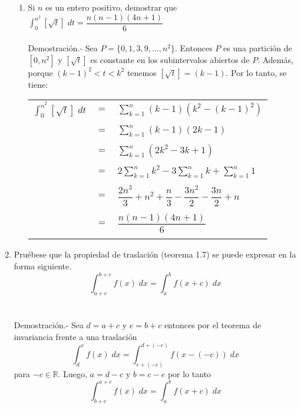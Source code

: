 \begin{enumerate}
\begin{enumerate}[\bfseries (a)]
		\item Si $n$ es un entero positivo, demostrar que $\displaystyle\int_{0}^{n^2} \left[ \sqrt{t}\right] \; dt = \dfrac{n(n-1)(4n+1)}{6}$\\\\
		    Demostración.-\; Sea $P=\lbrace 0,1,3,9,...,n^2\rbrace$. Entonces $P$ es una partición de $\left[0,n^2\right]$ y $\left[\sqrt{t}\right]$ es constante en los subintervalos abiertos de $P$. Además, porque $(k-1)^2 < t < k^2$ tenemos $\left[\sqrt{t}\right]=(k-1)$. Por lo tanto, se tiene:
		    \begin{center}
			\begin{tabular}{rcl}
			    $\displaystyle\int_{0}^{n^2} \left[\sqrt{t}\right]\; dt$&$=$&$\sum\limits_{k=1}^{n} (k-1)(k^2-(k-1)^2)$\\\\
			    &$=$&$\sum\limits_{k=1}^{n}(k-1)(2k-1)$\\\\
			    &$=$&$\sum\limits_{k=1}^{n} (2k^2 - 3k + 1)$\\\\
			    &$=$&$2\sum\limits_{k=1}^{n} k^2 - 3\sum\limits_{k=1}^{n} k + \sum\limits_{k=1}^{n} 1$\\\\
			    &$=$&$\dfrac{2n^3}{3} + n^2 + \dfrac{n}{3} - \dfrac{3n^2}{2} - \dfrac{3n}{2} + n$\\\\
			    &$=$&$\dfrac{n(n-1)(4n+1)}{6}$\\\\
			\end{tabular}
		    \end{center}
	\end{enumerate}

    \item Pruébese que la propiedad de traslación (teorema 1.7) se puede expresar en la forma siguiente. $$\displaystyle\int_{a+c}^{b+c}f(x) \; dx = \int_{a}^{b}f(x+c)\; dx$$\\\\
	Demostración.-\; Sea $d=a+c$ y $e=b+c$ entonces por el teorema de invariancia frente a una traslación $$\displaystyle\int_{d}^{e} f(x) \; dx = \int_{e+(-c)}^{d+(-c)} f(x-(-c)) \; dx$$ para $-c \in \mathbb{R}$. Luego, $a=d-c$ y $b=c-e$ por lo tanto $$\displaystyle\int_{b+c}^{a+c} f(x) \; dx = \int_{a}^{b} f(x+c) \; dx$$\\\\


\end{enumerate}
